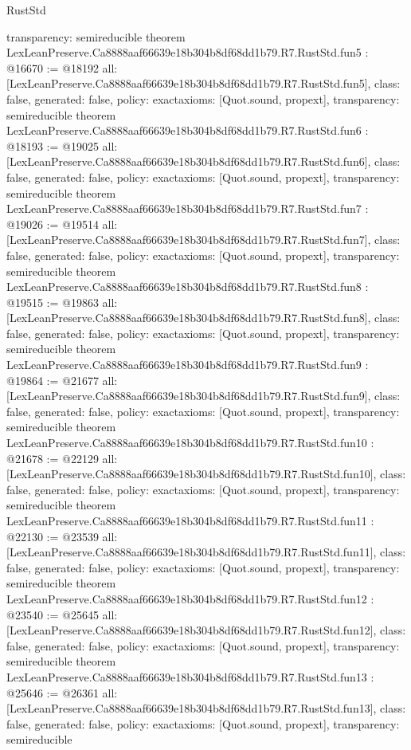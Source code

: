 \begin{lexlean}{RustStd}
\begin{coremodule}
{  transparency: semireducible
}
theorem LexLeanPreserve.Ca8888aaf66639e18b304b8df68dd1b79.R7.RustStd.fun5 : @16670 := @18192 {
  all: [LexLeanPreserve.Ca8888aaf66639e18b304b8df68dd1b79.R7.RustStd.fun5],
  class: false,
  generated: false,
  policy: exact{axioms: [Quot.sound, propext]},
  transparency: semireducible
}
theorem LexLeanPreserve.Ca8888aaf66639e18b304b8df68dd1b79.R7.RustStd.fun6 : @18193 := @19025 {
  all: [LexLeanPreserve.Ca8888aaf66639e18b304b8df68dd1b79.R7.RustStd.fun6],
  class: false,
  generated: false,
  policy: exact{axioms: [Quot.sound, propext]},
  transparency: semireducible
}
theorem LexLeanPreserve.Ca8888aaf66639e18b304b8df68dd1b79.R7.RustStd.fun7 : @19026 := @19514 {
  all: [LexLeanPreserve.Ca8888aaf66639e18b304b8df68dd1b79.R7.RustStd.fun7],
  class: false,
  generated: false,
  policy: exact{axioms: [Quot.sound, propext]},
  transparency: semireducible
}
theorem LexLeanPreserve.Ca8888aaf66639e18b304b8df68dd1b79.R7.RustStd.fun8 : @19515 := @19863 {
  all: [LexLeanPreserve.Ca8888aaf66639e18b304b8df68dd1b79.R7.RustStd.fun8],
  class: false,
  generated: false,
  policy: exact{axioms: [Quot.sound, propext]},
  transparency: semireducible
}
theorem LexLeanPreserve.Ca8888aaf66639e18b304b8df68dd1b79.R7.RustStd.fun9 : @19864 := @21677 {
  all: [LexLeanPreserve.Ca8888aaf66639e18b304b8df68dd1b79.R7.RustStd.fun9],
  class: false,
  generated: false,
  policy: exact{axioms: [Quot.sound, propext]},
  transparency: semireducible
}
theorem LexLeanPreserve.Ca8888aaf66639e18b304b8df68dd1b79.R7.RustStd.fun10 : @21678 := @22129 {
  all: [LexLeanPreserve.Ca8888aaf66639e18b304b8df68dd1b79.R7.RustStd.fun10],
  class: false,
  generated: false,
  policy: exact{axioms: [Quot.sound, propext]},
  transparency: semireducible
}
theorem LexLeanPreserve.Ca8888aaf66639e18b304b8df68dd1b79.R7.RustStd.fun11 : @22130 := @23539 {
  all: [LexLeanPreserve.Ca8888aaf66639e18b304b8df68dd1b79.R7.RustStd.fun11],
  class: false,
  generated: false,
  policy: exact{axioms: [Quot.sound, propext]},
  transparency: semireducible
}
theorem LexLeanPreserve.Ca8888aaf66639e18b304b8df68dd1b79.R7.RustStd.fun12 : @23540 := @25645 {
  all: [LexLeanPreserve.Ca8888aaf66639e18b304b8df68dd1b79.R7.RustStd.fun12],
  class: false,
  generated: false,
  policy: exact{axioms: [Quot.sound, propext]},
  transparency: semireducible
}
theorem LexLeanPreserve.Ca8888aaf66639e18b304b8df68dd1b79.R7.RustStd.fun13 : @25646 := @26361 {
  all: [LexLeanPreserve.Ca8888aaf66639e18b304b8df68dd1b79.R7.RustStd.fun13],
  class: false,
  generated: false,
  policy: exact{axioms: [Quot.sound, propext]},
  transparency: semireducible
}
\end{coremodule}
\end{lexlean}
